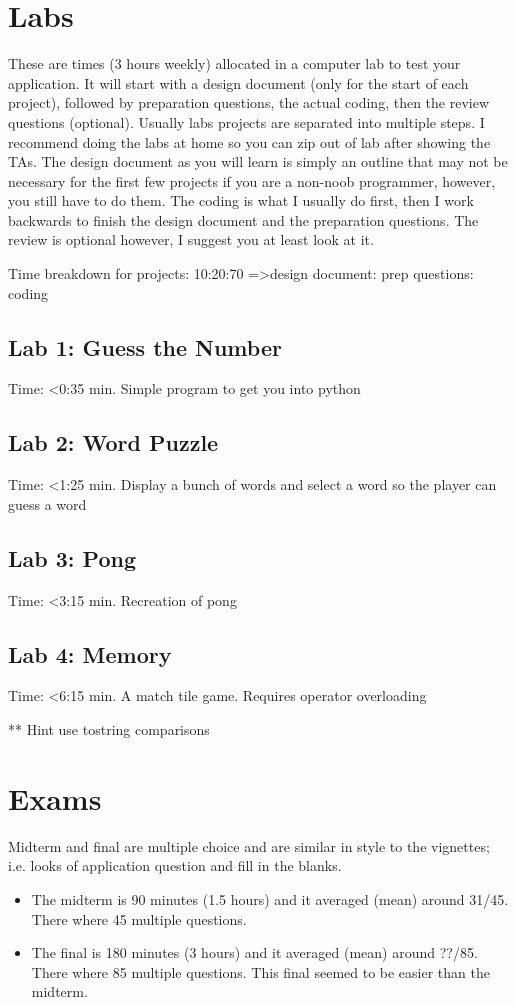 \documentclass[12pt]{article}
\begin{document}
\section{Labs}
These are times (3 hours weekly) allocated in a computer lab to test your application. It will start with a design document (only for the start of each project), followed by preparation questions, the actual coding, then the review questions (optional). Usually labs projects are separated into multiple steps. I recommend doing the labs at home so you can zip out of lab after showing the TAs. The design document as you will learn is simply an outline that may not be necessary for the first few projects if you are a non-noob programmer, however, you still have to do them. The coding is what I usually do first, then I work backwards to finish the design document and the preparation questions. The review is optional however, I suggest you at least look at it. 

Time breakdown for projects: 10:20:70 =\textgreater design document: prep questions: coding
\subsection{Lab 1: Guess the Number}
Time: \textless 0:35 min.
Simple program to get you into python
\subsection{Lab 2: Word Puzzle}
Time: \textless 1:25 min.
Display a bunch of words and select a word so the player can guess a word
\subsection{Lab 3: Pong}
Time: \textless 3:15 min.
Recreation of pong
\subsection{Lab 4: Memory}
Time: \textless 6:15 min.
A match tile game. Requires operator overloading

** Hint use tostring comparisons

\section{Exams}
Midterm and final are multiple choice and are similar in style to the vignettes; i.e. looks of application question and fill in the blanks. 

\begin{itemize}
  \item The midterm is 90 minutes (1.5 hours) and it averaged (mean) around 31/45. There where 45 multiple questions.
  \item The final is 180 minutes (3 hours) and it averaged (mean) around ??/85. There where 85 multiple questions. This final seemed to be easier than the midterm. 
\end{itemize}
\end{document}
